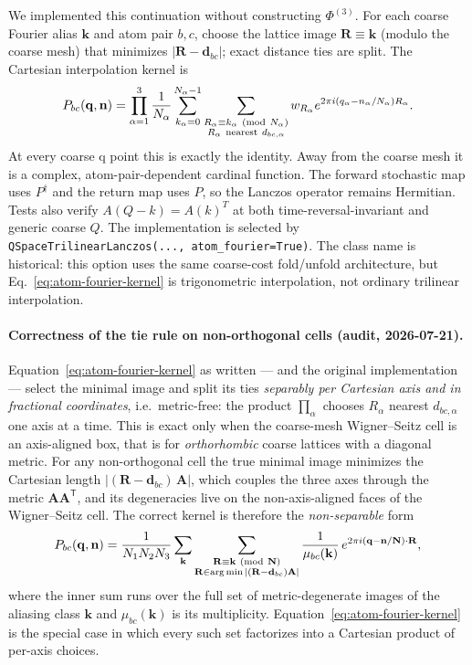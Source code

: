 \documentclass[11pt,a4paper]{article}
\newcommand{\qv}{\mathbf{q}}
\begin{document}
We implemented this continuation without constructing $\Phi^{(3)}$.  For
each coarse Fourier alias $\mathbf k$ and atom pair $b,c$, choose the
lattice image $\mathbf R\equiv\mathbf k$ (modulo the coarse mesh) that
minimizes $|\mathbf R-\mathbf d_{bc}|$; exact distance ties are split.  The
Cartesian interpolation kernel is
\begin{equation}
 P_{bc}(\qv,\mathbf n)=
 \prod_{\alpha=1}^{3}\frac{1}{N_\alpha}
 \sum_{k_\alpha=0}^{N_\alpha-1}
 \sum_{\substack{R_\alpha\equiv k_\alpha\ ({\rm mod}\ N_\alpha)\\
                  R_\alpha\ {\mathrm{nearest}}\ d_{bc,\alpha}}}
 w_{R_\alpha}
 e^{2\pi i(q_\alpha-n_\alpha/N_\alpha)R_\alpha}.
 \label{eq:atom-fourier-kernel}
\end{equation}
At every coarse q point this is exactly the identity.  Away from the
coarse mesh it is a complex, atom-pair-dependent cardinal function.  The
forward stochastic map uses $P^\dagger$ and the return map uses $P$, so the
Lanczos operator remains Hermitian.  Tests also verify
$A(Q-k)=A(k)^T$ at both time-reversal-invariant and generic coarse $Q$.
The implementation is selected by
\texttt{QSpaceTrilinearLanczos(..., atom\_fourier=True)}.  The class name is
historical: this option uses the same coarse-cost fold/unfold architecture,
but Eq.~\eqref{eq:atom-fourier-kernel} is trigonometric interpolation, not
ordinary trilinear interpolation.

\paragraph{Correctness of the tie rule on non-orthogonal cells (audit,
2026-07-21).}
Equation~\eqref{eq:atom-fourier-kernel} as written --- and the original
implementation --- select the minimal image and split its ties
\emph{separably per Cartesian axis and in fractional coordinates}, i.e.\
metric-free: the product $\prod_\alpha$ chooses $R_\alpha$ nearest
$d_{bc,\alpha}$ one axis at a time.  This is exact only when the
coarse-mesh Wigner--Seitz cell is an axis-aligned box, that is for
\emph{orthorhombic} coarse lattices with a diagonal metric.  For any
non-orthogonal cell the true minimal image minimizes the Cartesian length
$|(\mathbf R-\mathbf d_{bc})\,\mathbf A|$, which couples the three axes
through the metric $\mathbf A\mathbf A^{\mathsf T}$, and its degeneracies
live on the non-axis-aligned faces of the Wigner--Seitz cell.  The correct
kernel is therefore the \emph{non-separable} form
\begin{equation}
 P_{bc}(\qv,\mathbf n)=
 \frac{1}{N_1N_2N_3}
 \sum_{\mathbf k}
 \sum_{\substack{\mathbf R\equiv\mathbf k\ ({\rm mod}\ \mathbf N)\\
   \mathbf R\in\arg\min|(\mathbf R-\mathbf d_{bc})\mathbf A|}}
 \frac{1}{\mu_{bc}(\mathbf k)}\,
 e^{2\pi i(\qv-\mathbf n/\mathbf N)\cdot\mathbf R},
 \label{eq:atom-fourier-metric}
\end{equation}
where the inner sum runs over the full set of metric-degenerate images of
the aliasing class $\mathbf k$ and $\mu_{bc}(\mathbf k)$ is its
multiplicity.  Equation~\eqref{eq:atom-fourier-kernel} is the special case
in which every such set factorizes into a Cartesian product of per-axis
choices.
\end{document}
